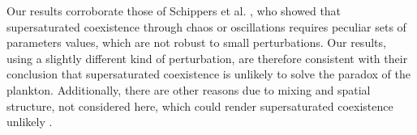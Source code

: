Our results corroborate those of Schippers et al. \cite{2008:Schippers}, who showed that supersaturated coexistence through chaos or oscillations requires peculiar sets of parameters values, which are not robust to small perturbations. Our results, using a slightly different kind of perturbation, are therefore consistent with their conclusion that supersaturated coexistence is unlikely to solve the paradox of the plankton. Additionally, there are other reasons due to mixing and spatial structure, not considered here, which could render supersaturated coexistence unlikely \cite{2008:Roelke}. 



